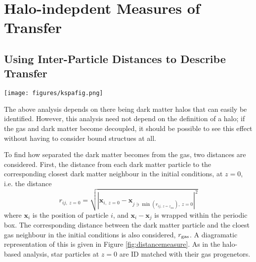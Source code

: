 \section{Halo-indepdent Measures of Transfer}

\subsection{Using Inter-Particle Distances to Describe Transfer}

\begin{figure*}
    \centering
    \texttt{[image: figures/kspafig.png]}
    \caption{A diagramatic representation of the distance measure. On the left, the initial conditions are shown. The blue dark matter particles each find their closest dark matter and gas (red) neighbour. These particles are then tracked to the final state of the simulation (right) and the distances between them calculated again. }
    \label{fig:distancemeasure}
\end{figure*}

The above analysis depends on there being dark matter halos that can easily be identified. However, this analysis need not depend on the definition of a halo; if the gas and dark matter become decoupled, it should be possible to see this effect without having to consider bound structues at all.

To find how separated the dark matter becomes from the gas, two distances are considered. First, the distance from each dark matter particle to the corresponding closest dark matter neighbour in the initial conditions, at $z=0$, i.e. the distance
\begin{equation}
    r_{ij, ~z=0} = \sqrt{
        \left|
            \mathbf{x}_{i, ~z=0} - \mathbf{x}_{j \ni \min(r_{ij, ~z=z_{ini}}), ~z=0}
        \right|^2
    }
    \label{eqn:minimal}
\end{equation}
where $\mathbf{x}_i$ is the position of particle $i$, and $\mathbf{x}_i - \mathbf{x}_j$ is wrapped within the periodic box. The corresponding distance between the dark matter particle and the cloest gas neighbour in the initial conditions is also considered, $r_{\rm gas}$. A diagramatic representation of this is given in Figure \ref{fig:distancemeasure}. As in the halo-based analysis, star particles at $z=0$ are ID matched with their gas progenetors.

